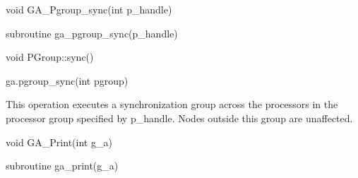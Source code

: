 \documentclass[12pt]{article}
\begin{document}
\begin{capi}
\begin{ccode}
void GA_Pgroup_sync(int p_handle)
\end{ccode}
\begin{funcargs}
\end{funcargs}
\end{capi}

\begin{fapi}
\begin{fcode}
subroutine ga_pgroup_sync(p_handle)
\end{fcode}
\begin{funcargs}
\end{funcargs}
\end{fapi}

\begin{cxxapi}
\begin{cxxcode}
void PGroup::sync()
\end{cxxcode}
\end{cxxapi}

\begin{pyapi}
\begin{pycode}
ga.pgroup_sync(int pgroup)
\end{pycode}
\begin{funcargs}
\end{funcargs}
\end{pyapi}

\gcoll

\begin{desc}
This operation executes a synchronization group across the processors in the
processor group specified by p_handle. Nodes outside this group are unaffected.
\end{desc}



\begin{capi}
\begin{ccode}
void GA_Print(int g_a)
\end{ccode}
\begin{funcargs}
\end{funcargs}
\end{capi}

\begin{fapi}
\begin{fcode}
subroutine ga_print(g_a)
\end{fcode}
\begin{funcargs}
\end{funcargs}
\end{fapi}
\end{document}
